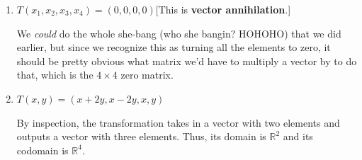 \documentclass{article}
\begin{document}
\begin{enumerate}
\begin{solution}
\[\begin{bmatrix}
\begin{pmatrix}
                    \begin{bmatrix}
                        0\\1\\0\\0
                    \end{bmatrix}
                \end{pmatrix}\scalebox{1.6}{\Bigg|}T\!\begin{pmatrix}
                    \begin{bmatrix}
                        0\\0\\1\\0
                    \end{bmatrix}
                \end{pmatrix}\scalebox{1.6}{\Bigg|}T\!\begin{pmatrix}
                    \begin{bmatrix}
                        0\\0\\0\\1
                    \end{bmatrix}
                \end{pmatrix}
            \end{bmatrix} = \begin{bmatrix}
                0&0&0&1\\0&0&1&0\\1&1&0&0\\1&0&0&0
            \end{bmatrix} 
        \] is the standard matrix for \(T\).
    \end{solution}
    \item \(T(x_1,x_2,x_3,x_4) = (0,0,0,0)\)\hspace{10pt}[This is \textbf{vector annihilation}.]\begin{solution}
        We \textit{could} do the whole she-bang (who she bangin? HOHOHO) that we did earlier, but since we recognize this as turning all the elements to zero, it should be pretty obvious 
        what matrix we'd have to multiply a vector by to do that, which is the \(4\times 4\) zero matrix. 
    \end{solution}
    \item \(T(x,y) = (x+2y, x-2y, x,y)\)\begin{solution}
        By inspection, the transformation takes in a vector with two elements and outputs a vector with three elements. Thus, its domain is \(\mathbb{R}^2\) and its codomain is \(\mathbb{R}^4\).\par

\end{solution}
\end{enumerate}
\end{document}
